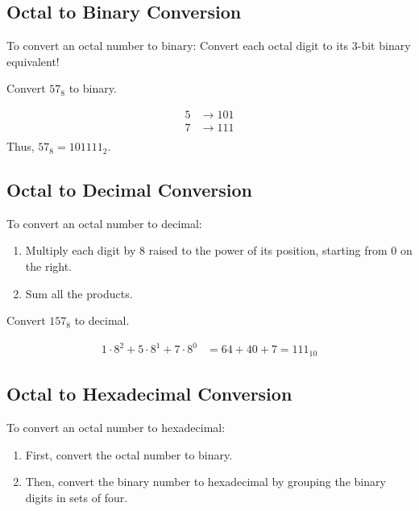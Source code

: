 \subsection*{Octal to Binary Conversion}
To convert an octal number to binary: Convert each octal digit to its 3-bit binary equivalent!

\begin{example}Convert \(57_8\) to binary.

\begin{solution}
\[
\begin{aligned}
5 & \rightarrow 101 \\
7 & \rightarrow 111 \\
\end{aligned}
\]
Thus, \(57_8 = 101111_2\). \end{solution}

\end{example}

\subsection*{Octal to Decimal Conversion}
To convert an octal number to decimal:
\begin{enumerate}
    \item Multiply each digit by 8 raised to the power of its position, starting from 0 on the right.
    \item Sum all the products.
\end{enumerate}

\begin{example}Convert \(157_8\) to decimal.

\begin{solution}
    
\[
\begin{aligned}
1 \cdot 8^2 + 5 \cdot 8^1 + 7 \cdot 8^0 & = 64 + 40 + 7 = 111_{10}
\end{aligned}
\] \end{solution}

\end{example}

\subsection*{Octal to Hexadecimal Conversion}
To convert an octal number to hexadecimal:
\begin{enumerate}
    \item First, convert the octal number to binary.
    \item Then, convert the binary number to hexadecimal by grouping the binary digits in sets of four.
\end{enumerate}

